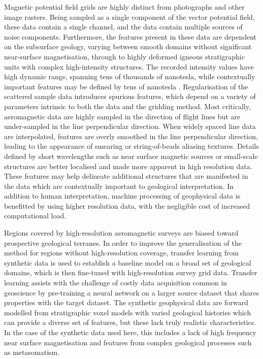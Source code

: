 \documentclass[manuscript.tex]{subfiles}
\begin{document}
Magnetic potential field grids are highly distinct from photographs and other image rasters.
Being sampled as a single component of the vector potential field, these data contain a single channel, and the data contain multiple sources of noise components.
Furthermore, the features present in these data are dependent on the subsurface geology, varying between smooth domains without significant near-surface magnetisation, through to highly deformed igneous stratigraphic units with complex high-intensity structures.
The recorded intensity values have high dynamic range, spanning tens of thousands of nanotesla, while contextually important features may be defined by tens of nanotesla \parencite{kovesiPhasePreservingTone2012}.
Regularisation of the scattered sample data introduces spurious features, which depend on a variety of parameters intrinsic to both the data and the gridding method.
Most critically, aeromagnetic data are highly sampled in the direction of flight lines but are under-sampled in the line perpendicular direction.
When widely spaced line data are interpolated, features are overly smoothed in the line perpendicular direction, leading to the appearance of smearing or string-of-beads aliasing textures.
Details defined by short wavelengths such as near surface magnetic sources or small-scale structures are better localised and made more apparent in high resolution data.
These features may help delineate additional structures that are manifested in the data which are contextually important to geological interpretation.
In addition to human interpretation, machine processing of geophysical data is benefitted by using higher resolution data, with the negligible cost of increased computational load.

Regions covered by high-resolution aeromagnetic surveys are biased toward prospective geological terranes.
In order to improve the generalisation of the method for regions without high-resolution coverage, transfer learning \parencite{tanSurveyDeepTransfer2018} from synthetic data is used to establish a baseline model on a broad set of geological domains, which is then fine-tuned with high-resolution survey grid data.
Transfer learning assists with the challenge of costly data acquisition common in geoscience \parencite{dawsonImpactDatasetSize2023} by pre-training a neural network on a larger source dataset that shares properties with the target dataset.
The synthetic geophysical data \parencite{jessellNoddyverseMassiveData2022} are forward modelled from stratigraphic voxel models with varied geological histories which can provide a diverse set of features, but these lack truly realistic characteristics.
In the case of the synthetic data used here, this includes a lack of high frequency near surface magnetisation and features from complex geological processes such as metasomatism.
\end{document}
